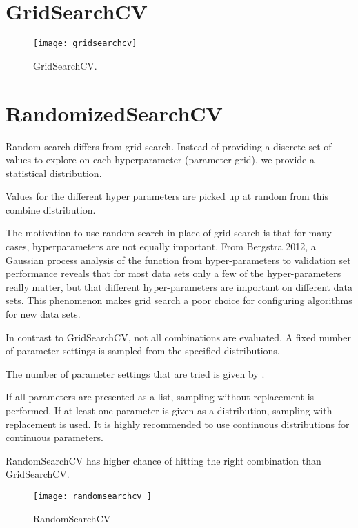 	\section{GridSearchCV}

	\begin{figure}[tbh]
		\centering
		\texttt{[image: gridsearchcv]}
		\caption[GridSearchCV]{GridSearchCV.}
		\label{fig:gridsearchcv}
	\end{figure}


	\section{\codefont RandomizedSearchCV}

	\begin{bulletedlist}
	\item Random search differs from grid search. Instead of providing a discrete set of values to explore on each hyperparameter (parameter grid), we provide a statistical distribution.
	\item Values for the different hyper parameters are picked up at random from this combine distribution.
	\item The motivation to use random search in place of grid search is that for many cases, hyperparameters are not equally important.  From Bergstra 2012, a Gaussian process analysis of the function from hyper-parameters to validation set performance reveals that for most data sets only a few of the hyper-parameters really matter, but that different hyper-parameters
are important on different data sets. This phenomenon makes grid search a poor choice for configuring algorithms for new data sets.
	\item In contrast to GridSearchCV, not all combinations are evaluated.  A fixed number of parameter settings is sampled from the specified distributions.
	\item The number of parameter settings that are tried is given by .
	\item If all parameters are presented as a list, sampling without replacement is performed. If at least one parameter is given as a distribution, sampling with replacement is used. It is highly recommended to use continuous distributions for continuous parameters.
	\item RandomSearchCV has higher chance of hitting the right combination than GridSearchCV.
	\end{bulletedlist}

	\begin{figure}[tbh]
		\centering
		\texttt{[image: randomsearchcv ]}
		\caption[RandomSearchCV]{RandomSearchCV}
		\label{fig:randomsearchcv}
	\end{figure} 